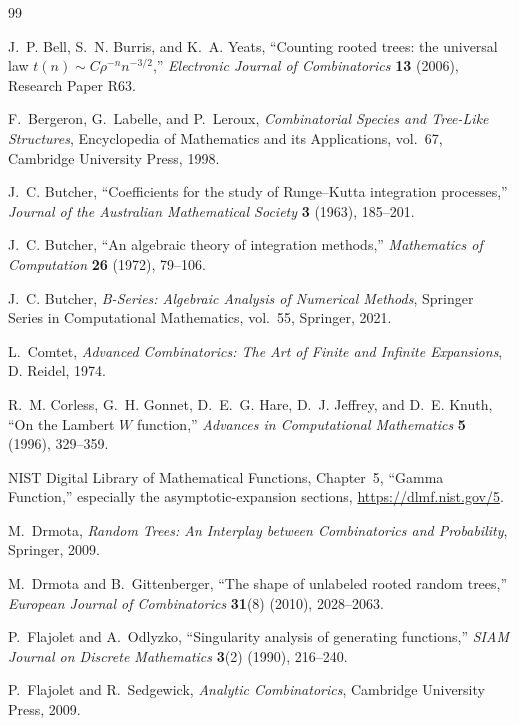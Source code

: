 \documentclass[11pt,a4paper,oneside,openany]{book}
\theoremstyle{definition}
\theoremstyle{remark}
\begin{document}
\begin{thebibliography}{99}

J.~P. Bell, S.~N. Burris, and K.~A. Yeats,
``Counting rooted trees: the universal law
$t(n)\sim C\rho^{-n}n^{-3/2}$,''
\emph{Electronic Journal of Combinatorics} \textbf{13} (2006), Research Paper
R63.

F.~Bergeron, G.~Labelle, and P.~Leroux,
\emph{Combinatorial Species and Tree-Like Structures},
Encyclopedia of Mathematics and its Applications, vol.~67,
Cambridge University Press, 1998.

J.~C. Butcher,
``Coefficients for the study of Runge--Kutta integration processes,''
\emph{Journal of the Australian Mathematical Society} \textbf{3} (1963),
185--201.

J.~C. Butcher,
``An algebraic theory of integration methods,''
\emph{Mathematics of Computation} \textbf{26} (1972), 79--106.

J.~C. Butcher,
\emph{B-Series: Algebraic Analysis of Numerical Methods},
Springer Series in Computational Mathematics, vol.~55, Springer, 2021.

L.~Comtet,
\emph{Advanced Combinatorics: The Art of Finite and Infinite Expansions},
D. Reidel, 1974.

R.~M. Corless, G.~H. Gonnet, D.~E.~G. Hare, D.~J. Jeffrey, and D.~E. Knuth,
``On the Lambert $W$ function,''
\emph{Advances in Computational Mathematics} \textbf{5} (1996), 329--359.

NIST Digital Library of Mathematical Functions,
Chapter~5, ``Gamma Function,'' especially the asymptotic-expansion sections,
\url{https://dlmf.nist.gov/5}.

M.~Drmota,
\emph{Random Trees: An Interplay between Combinatorics and Probability},
Springer, 2009.

M.~Drmota and B.~Gittenberger,
``The shape of unlabeled rooted random trees,''
\emph{European Journal of Combinatorics} \textbf{31}(8) (2010), 2028--2063.

P.~Flajolet and A.~Odlyzko,
``Singularity analysis of generating functions,''
\emph{SIAM Journal on Discrete Mathematics} \textbf{3}(2) (1990), 216--240.

P.~Flajolet and R.~Sedgewick,
\emph{Analytic Combinatorics}, Cambridge University Press, 2009.


\end{thebibliography}
\end{document}
